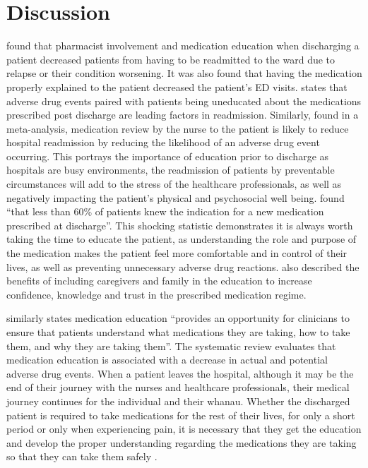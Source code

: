 \documentclass[british,12pt,a4paper]{article}
\begin{document}
	\section{Discussion}
	\textcite{Phatak2015} found that pharmacist involvement and medication education when discharging a patient decreased patients from having to be readmitted to the ward due to relapse or their condition worsening. It was also found that having the medication properly explained to the patient decreased the patient's ED visits. \citeauthor{Phatak2015} states that adverse drug events paired with patients being uneducated about the medications prescribed post discharge are leading factors in readmission. Similarly, \textcite{Alper2023} found in a meta-analysis, medication review by the nurse to the patient is likely to reduce hospital readmission by reducing the likelihood of an adverse drug event occurring. This portrays the importance of education prior to discharge as hospitals are busy environments, the readmission of patients by preventable circumstances will add to the stress of the healthcare professionals, as well as negatively impacting the patient's physical and psychosocial well being. \citeauthor{Phatak2015} found “that less than 60\% of patients knew the indication for a new medication prescribed at discharge”. This shocking statistic demonstrates it is always worth taking the time to educate the patient, as understanding the role and purpose of the medication makes the patient feel more comfortable and in control of their lives, as well as preventing unnecessary adverse drug reactions. \citeauthor{Alper2023} also described the benefits of including caregivers and family in the education to increase confidence, knowledge and trust in the prescribed medication regime. 

	\citeauthor{Alper2023} similarly states medication education “provides an opportunity for clinicians to ensure that patients understand what medications they are taking, how to take them, and why they are taking them”. The systematic review evaluates that medication education is associated with a decrease in actual and potential adverse drug events. When a patient leaves the hospital, although it may be the end of their journey with the nurses and healthcare professionals, their medical journey continues for the individual and their whanau. Whether the discharged patient is required to take medications for the rest of their lives, for only a short period or only when experiencing pain, it is necessary that they get the education and develop the proper understanding regarding the medications they are taking so that they can take them safely \parencite{Yap2016}. 
\end{document}
